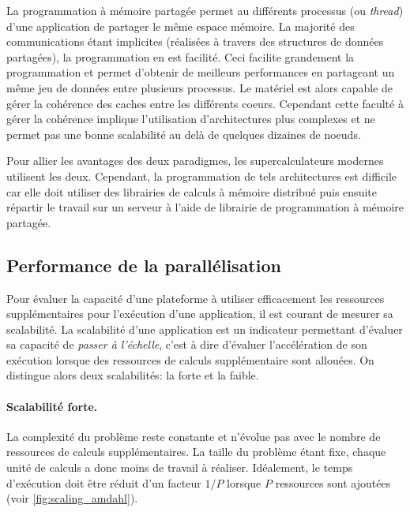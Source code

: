             La programmation à mémoire partagée permet au différents processus (ou \textit{thread}) d'une application de partager le même espace mémoire. La majorité des communications étant implicites (réalisées à travers des structures de données partagées), la programmation en est facilité. Ceci facilite grandement la programmation et permet d'obtenir de meilleurs performances en partageant un même jeu de données entre plusieurs processus. Le matériel est alors capable de gérer la cohérence des caches entre les différents coeurs. Cependant cette faculté à gérer la cohérence implique l'utilisation d'architectures plus complexes et ne permet pas une bonne scalabilité au delà de quelques dizaines de noeuds. 
            
            Pour allier les avantages des deux paradigmes, les supercalculateurs modernes utilisent les deux. Cependant, la programmation de tels architectures est difficile car elle doit utiliser des librairies de calculs à mémoire distribué puis ensuite répartir le travail sur un serveur à l'aide de librairie de programmation à mémoire partagée.



\subsection{Performance de la parallélisation}\label{sec:parallele_perf}
    
    Pour évaluer la capacité d'une plateforme à utiliser efficacement les ressources supplémentaires pour l'exécution d'une application, il est courant de mesurer sa scalabilité. La scalabilité d'une application est un indicateur permettant d'évaluer sa capacité de \textit{passer à l'échelle}, c'est à dire d'évaluer l'accélération de son exécution lorsque des ressources de calculs supplémentaire sont allouées. On distingue alors deux scalabilités: la forte et la faible.
    
    \paragraph{Scalabilité forte.} La complexité du problème reste constante et n'évolue pas avec le nombre de ressources de calculs supplémentaires. La taille du problème étant fixe, chaque unité de calculs a donc moins de travail à réaliser. Idéalement, le temps d'exécution doit être réduit d'un facteur $1/P$ lorsque $P$ ressources sont ajoutées (voir \autoref{fig:scaling_amdahl}). 
    
